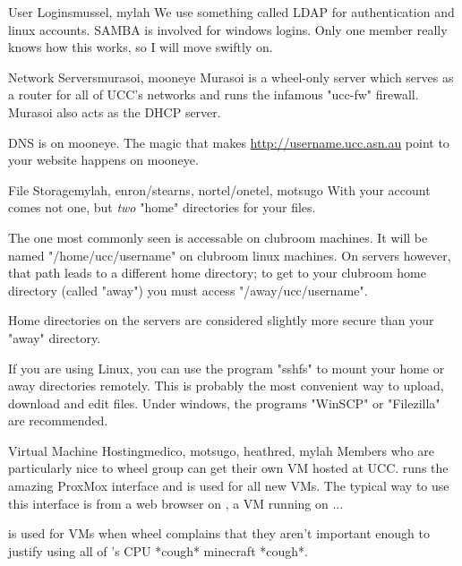 \begin{uccservice}{User Logins}{mussel, mylah}
We use something called LDAP for authentication and linux accounts. SAMBA is involved for windows logins. Only one member really knows how this works, so I will move swiftly on.
\end{uccservice}

\begin{uccservice}{Network Servers}{murasoi, mooneye}
Murasoi is a wheel-only server which serves as a router for all of UCC's networks and runs the infamous "ucc-fw" firewall. Murasoi also acts as the DHCP server.

DNS is on mooneye. The magic that makes \url{http://username.ucc.asn.au} point to your website happens on mooneye.
\end{uccservice}

\begin{uccservice}{File Storage}{mylah, enron/stearns, nortel/onetel, motsugo}
With your account comes not one, but \emph{two} "home" directories for your files.

The one most commonly seen is accessable on clubroom machines. It will be named "/home/ucc/username" on clubroom linux machines. On servers however, that path leads to a different home directory; to get to your clubroom home directory (called "away") you must access "/away/ucc/username".

Home directories on the servers are considered slightly more secure than your "away" directory. 


If you are using Linux, you can use the program "sshfs" to mount your home or away directories remotely. This is probably the most convenient way to upload, download and edit files. Under windows, the programs "WinSCP" or "Filezilla" are recommended.


\end{uccservice}

\begin{uccservice}{Virtual Machine Hosting}{medico, motsugo, heathred, mylah}
Members who are particularly nice to wheel group can get their own VM hosted at UCC.  runs the amazing ProxMox interface and is used for all new VMs. The typical way to use this interface is from a web browser on , a VM running on ...

 is used for VMs when wheel complains that they aren't important enough to justify using all of 's CPU *cough* minecraft *cough*.
\end{uccservice}


